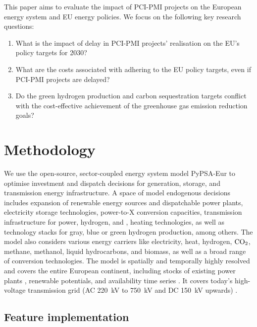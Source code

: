 \documentclass[final,5p,times,twocolumn]{elsarticle}
\let\autocite\cite
\begin{document}
This paper aims to evaluate the impact of PCI-PMI projects on the European energy system and EU energy policies. We focus on the following key research questions:

\begin{enumerate} 
  \item What is the impact of delay in PCI-PMI projects' realisation on the EU's policy targets for 2030?
  \item What are the costs associated with adhering to the EU policy targets, even if PCI-PMI projects are delayed? 
  \item Do the green hydrogen production and carbon sequestration targets conflict with the cost-effective achievement of the greenhouse gas emission reduction goals? 
\end{enumerate}

\section{Methodology}
\label{sec:methodology}

We use the open-source, sector-coupled energy system model PyPSA-Eur \cite{neumannPotentialRoleHydrogen2023,frysztackiComparisonClusteringMethods2022,glaumOffshorePowerHydrogen2024,horschPyPSAEurOpenOptimisation2018} to optimise investment and dispatch decisions for generation, storage, and transmission energy infrastructure. 
A space of model endogenous decisions includes expansion of renewable energy sources and dispatchable power plants, electricity storage technologies, power-to-X conversion capacities, transmission infrastructure for power, hydrogen, and , heating technologies, as well as technology stacks for gray, blue or green hydrogen production, among others. 
The model also considers various energy carriers like electricity, heat, hydrogen, $\ce{CO2}$, methane, methanol, liquid hydrocarbons, and biomass, as well as a broad range of conversion technologies.
The model is spatially and temporally highly resolved and covers the entire European continent, including stocks of existing power plants \autocite{gotzensPerformingEnergyModelling2019}, renewable potentials, and availability time series \autocite{hofmannAtliteLightweightPython2021}. It covers today's high-voltage transmission grid (AC \SI{220}{kV} to \SI{750}{kV} and DC \SI{150}{kV} upwards) \autocite{xiongModellingHighVoltageGrid2024}.

\subsection{Feature implementation}
\label{sec:feature_implementation}
\end{document}
